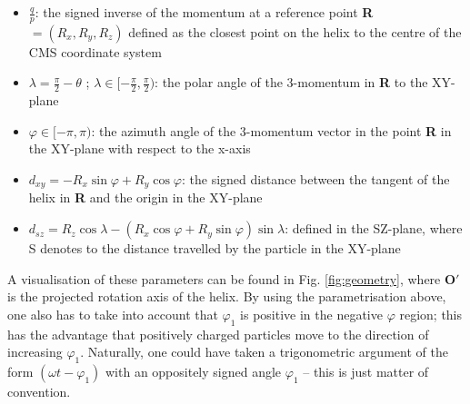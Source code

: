 \begin{itemize}
	\item $\frac{q}{p}$: the signed inverse of the momentum at a reference point \textbf{R} $=(R_x, R_y, R_z)$ defined as the closest point on the helix to the centre of the CMS coordinate system
	\item $\lambda = \frac{\pi}{2} - \theta$ ; $\lambda \in [-\frac{\pi}{2}, \frac{\pi}{2})$: the polar angle of the 3-momentum in \textbf{R} to the XY-plane
	\item $\varphi \in [-\pi,\pi)$: the azimuth angle of the 3-momentum vector in the point \textbf{R} in the XY-plane with respect to the x-axis
	\item $d_{xy} = -R_x \sin\varphi + R_y \cos\varphi$: the signed distance between the tangent of the helix in \textbf{R} and the origin in the XY-plane
	\item $d_{sz} = R_z\cos\lambda - (R_x\cos\varphi+R_y\sin\varphi)\sin\lambda$: defined in the SZ-plane, where S denotes to the distance travelled by the particle in the XY-plane
\end{itemize}
A visualisation of these parameters can be found in Fig. \ref{fig:geometry}, where $\boldsymbol{O'}$ is the projected rotation axis of the helix. By using the parametrisation above, one also has to take into account that $\varphi_1$ is positive in the negative $\varphi$ region; this has the advantage that positively charged particles move to the direction of increasing $\varphi_1$. Naturally, one could have taken a trigonometric argument of the form $(\omega t-\varphi_1)$ with an oppositely signed angle $\varphi_1$ -- this is just matter of convention.
